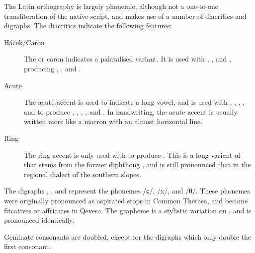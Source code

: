 \documentclass[grammar]{subfiles}
\begin{document}
The Latin orthography is largely phonemic, although not a one-to-one
transliteration of the native script, and makes use of a number of diacritics
and digraphs.  The diacritics indicate the following features:

\begin{description}
  \item[Háček/Caron] The  or caron indicates a palatalised
    variant.  It is used with , ,  and
    , producing , ,  and
    .
  \item[Acute] The acute accent is used to indicate a long vowel, and is used
    with , , , ,  and
     to produce , , , ,
     and .  In handwriting, the acute accent is usually
    written more like a macron with an almost horizontal line. 
  \item[Ring] The ring accent is only used with  to produce
    . This is a long variant of  that stems from the
    former diphthong , and is still pronounced that in the
    regional dialect of the southern slopes.
\end{description}

The digraphs , , and  represent the
phonemes /ɕ/, /x/, and /θ/.  These phonemes were originally pronounced as
aspirated stops in Common Therasa, and became fricatives or affricates in
Qevesa.  The grapheme  is a stylistic variation on , and
is pronounced identically.

Geminate consonants are doubled, except for the digraphs which only double the
first consonant.  
\end{document}
